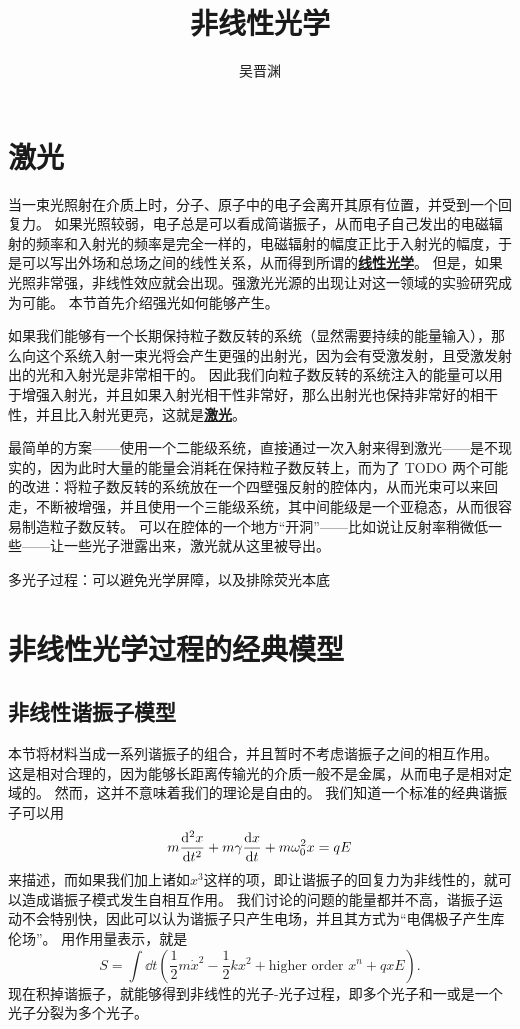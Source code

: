\documentclass[UTF8, a4paper]{ctexart}
\title{非线性光学}
\author{吴晋渊}
\newcommand{\concept}[1]{\underline{\textbf{#1}}}
\begin{document}
\maketitle

\section{激光}

当一束光照射在介质上时，分子、原子中的电子会离开其原有位置，并受到一个回复力。
如果光照较弱，电子总是可以看成简谐振子，从而电子自己发出的电磁辐射的频率和入射光的频率是完全一样的，电磁辐射的幅度正比于入射光的幅度，于是可以写出外场和总场之间的线性关系，从而得到所谓的\concept{线性光学}。
但是，如果光照非常强，非线性效应就会出现。强激光光源的出现让对这一领域的实验研究成为可能。
本节首先介绍强光如何能够产生。

如果我们能够有一个长期保持粒子数反转的系统（显然需要持续的能量输入），那么向这个系统入射一束光将会产生更强的出射光，因为会有受激发射，且受激发射出的光和入射光是非常相干的。
因此我们向粒子数反转的系统注入的能量可以用于增强入射光，并且如果入射光相干性非常好，那么出射光也保持非常好的相干性，并且比入射光更亮，这就是\concept{激光}。

最简单的方案——使用一个二能级系统，直接通过一次入射来得到激光——是不现实的，因为此时大量的能量会消耗在保持粒子数反转上，而为了 TODO
两个可能的改进：将粒子数反转的系统放在一个四壁强反射的腔体内，从而光束可以来回走，不断被增强，并且使用一个三能级系统，其中间能级是一个亚稳态，从而很容易制造粒子数反转。
可以在腔体的一个地方“开洞”——比如说让反射率稍微低一些——让一些光子泄露出来，激光就从这里被导出。

多光子过程：可以避免光学屏障，以及排除荧光本底

\section{非线性光学过程的经典模型}

\subsection{非线性谐振子模型}

本节将材料当成一系列谐振子的组合，并且暂时不考虑谐振子之间的相互作用。
这是相对合理的，因为能够长距离传输光的介质一般不是金属，从而电子是相对定域的。
然而，这并不意味着我们的理论是自由的。
我们知道一个标准的经典谐振子可以用
\begin{equation}
    m \dv[2]{x}{t} + m \gamma \dv{x}{t} + m \omega_0^2 x = q E
\end{equation}
来描述，而如果我们加上诸如$x^3$这样的项，即让谐振子的回复力为非线性的，就可以造成谐振子模式发生自相互作用。
我们讨论的问题的能量都并不高，谐振子运动不会特别快，因此可以认为谐振子只产生电场，并且其方式为“电偶极子产生库伦场”。
用作用量表示，就是%
\[
    S = \int \dd{t} \left( \frac{1}{2} m \dot{x}^2 - \frac{1}{2} k x^2 + \text{higher order $x^n$} + qxE \right).
\]
现在积掉谐振子，就能够得到非线性的光子-光子过程，即多个光子和一或是一个光子分裂为多个光子。
\end{document}
